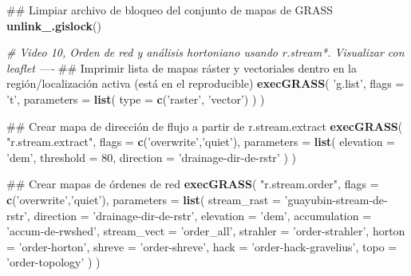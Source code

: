 \documentclass[11pt,]{article}
\newenvironment{Shaded}{\begin{snugshade}}{\end{snugshade}}
\newcommand{\KeywordTok}[1]{\textcolor[rgb]{0.13,0.29,0.53}{\textbf{#1}}}
\newcommand{\DataTypeTok}[1]{\textcolor[rgb]{0.13,0.29,0.53}{#1}}
\newcommand{\DecValTok}[1]{\textcolor[rgb]{0.00,0.00,0.81}{#1}}
\newcommand{\StringTok}[1]{\textcolor[rgb]{0.31,0.60,0.02}{#1}}
\newcommand{\CommentTok}[1]{\textcolor[rgb]{0.56,0.35,0.01}{\textit{#1}}}
\newcommand{\NormalTok}[1]{#1}
\begin{document}
\begin{Shaded}
\begin{Highlighting}[]
{{{{{{\NormalTok{## Limpiar archivo de bloqueo del conjunto de mapas de GRASS}
\KeywordTok{unlink_.gislock}\NormalTok{()}


\CommentTok{# Video 10,  Orden de red y análisis hortoniano usando r.stream*. Visualizar con leaflet ----}
\NormalTok{## Imprimir lista de mapas ráster y vectoriales dentro en la región/localización activa (está en el reproducible)}
\KeywordTok{execGRASS}\NormalTok{(}
  \StringTok{'g.list'}\NormalTok{,}
  \DataTypeTok{flags =} \StringTok{'t'}\NormalTok{,}
  \DataTypeTok{parameters =} \KeywordTok{list}\NormalTok{(}
    \DataTypeTok{type =} \KeywordTok{c}\NormalTok{(}\StringTok{'raster'}\NormalTok{, }\StringTok{'vector'}\NormalTok{)}
\NormalTok{  )}
\NormalTok{)}

\NormalTok{## Crear mapa de dirección de flujo a partir de r.stream.extract}
\KeywordTok{execGRASS}\NormalTok{(}
  \StringTok{"r.stream.extract"}\NormalTok{,}
  \DataTypeTok{flags =} \KeywordTok{c}\NormalTok{(}\StringTok{'overwrite'}\NormalTok{,}\StringTok{'quiet'}\NormalTok{),}
  \DataTypeTok{parameters =} \KeywordTok{list}\NormalTok{(}
    \DataTypeTok{elevation =} \StringTok{'dem'}\NormalTok{,}
    \DataTypeTok{threshold =} \DecValTok{80}\NormalTok{,}
    \DataTypeTok{direction =} \StringTok{'drainage-dir-de-rstr'}
\NormalTok{  )}
\NormalTok{)}

\NormalTok{## Crear mapas de órdenes de red}
\KeywordTok{execGRASS}\NormalTok{(}
  \StringTok{"r.stream.order"}\NormalTok{,}
  \DataTypeTok{flags =} \KeywordTok{c}\NormalTok{(}\StringTok{'overwrite'}\NormalTok{,}\StringTok{'quiet'}\NormalTok{),}
  \DataTypeTok{parameters =} \KeywordTok{list}\NormalTok{(}
    \DataTypeTok{stream_rast =} \StringTok{'guayubin-stream-de-rstr'}\NormalTok{,}
    \DataTypeTok{direction =} \StringTok{'drainage-dir-de-rstr'}\NormalTok{,}
    \DataTypeTok{elevation =} \StringTok{'dem'}\NormalTok{,}
    \DataTypeTok{accumulation =} \StringTok{'accum-de-rwshed'}\NormalTok{,}
    \DataTypeTok{stream_vect =} \StringTok{'order_all'}\NormalTok{,}
    \DataTypeTok{strahler =} \StringTok{'order-strahler'}\NormalTok{,}
    \DataTypeTok{horton =} \StringTok{'order-horton'}\NormalTok{,}
    \DataTypeTok{shreve =} \StringTok{'order-shreve'}\NormalTok{,}
    \DataTypeTok{hack =} \StringTok{'order-hack-gravelius'}\NormalTok{,}
    \DataTypeTok{topo =} \StringTok{'order-topology'}
\NormalTok{  )}
\NormalTok{)}

}}}}}}
\end{Highlighting}
\end{Shaded}
\end{document}
